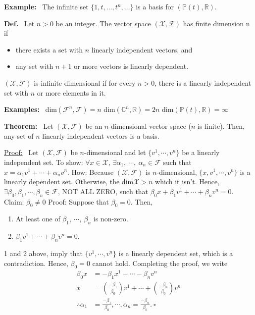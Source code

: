 \documentclass[letterpaper]{article}
\begin{document}
\noindent \textbf{Example:}~ The infinite set $\{1,t,\dots,t^n,\dots\}$ is a basis for $(\mathbb{P}(t),\mathbb{R})$.

\noindent \textbf{Def.}~ Let $n>0$ be an integer. The vector space $(\mathcal{X},\mathcal{F})$ has finite dimension n if
    \begin{itemize}
        \item there exists a set with $n$ linearly independent vectors, and
        \item any set with $n+1$ or more vectors is linearly dependent.
    \end{itemize}
    $(\mathcal{X},\mathcal{F})$ is infinite dimensional if for every $n>0$, there is a linearly independent set with $n$ or more elements in it.

\newpage

\noindent \textbf{Examples:}~
    \newline
    dim$(\mathcal{F}^n,\mathcal{F})=n$
    \newline
    dim$(\mathbb{C}^n,\mathbb{R})=2n$
    \newline
    dim$(\mathbb{P}(t),\mathbb{R})=\infty$

\noindent \textbf{Theorem:}~ Let $(\mathcal{X},\mathcal{F})$ be an $n$-dimensional vector space ($n$ is finite). Then, any set of $n$ linearly independent vectors is a basis.

\underline{Proof:}~ Let $(\mathcal{X}, \mathcal{F})$ be $n$-dimensional and let $\{v^1,\dotsb,v^n\}$ be a linearly independent set.
    \newline
    To show: $\forall x \in \mathcal{X}$, $\exists \alpha_1,\ \dotsb,\ \alpha_n\in\mathcal{F}$ such that $x=\alpha_1v^1+\dotsb+\alpha_nv^n$.
    \newline
    How: Because $(\mathcal{X},\mathcal{F})$ is $n$-dimensional, $\{x,v^1,\dotsb,v^n\}$ is a linearly dependent set. Otherwise, the dim$\mathcal{X}>n$ which it isn't. Hence, $\exists\beta_0,\beta_1,\dotsb,\beta_n\in\mathcal{F}$, NOT ALL ZERO, such that $\beta_0x+\beta_1v^1+\dotsb+\beta_nv^n=0$.
    \newline
    Claim: $\beta_0\neq 0$
    \newline
    Proof: Suppose that $\beta_0=0$. Then,
    \begin{enumerate}
        \item At least one of $\beta_1,\ \dotsb,\ \beta_n$ is non-zero.
        \item $\beta_1v^1+\dotsb+\beta_nv^n=0$.
    \end{enumerate}
    1 and 2 above, imply that $\{v^1,\dotsb,v^n\}$ is a linearly dependent set, which is a contradiction. Hence, $\beta_0=0$ cannot hold. Completing the proof, we write
    \begin{align*}
        \beta_0x &= -\beta_1x^1-\dotsb-\beta_nv^n\\
        x&=\left(\frac{-\beta_1}{\beta_0}\right)v^1+\dotsb+\left(\frac{-\beta_n}{\beta_0}\right)v^n\\
        \therefore \alpha_1 &= \frac{-\beta_1}{\beta_0},\dotsb,\alpha_n=\frac{-\beta_n}{\beta_0}.\ \square
    \end{align*}
\end{document}
